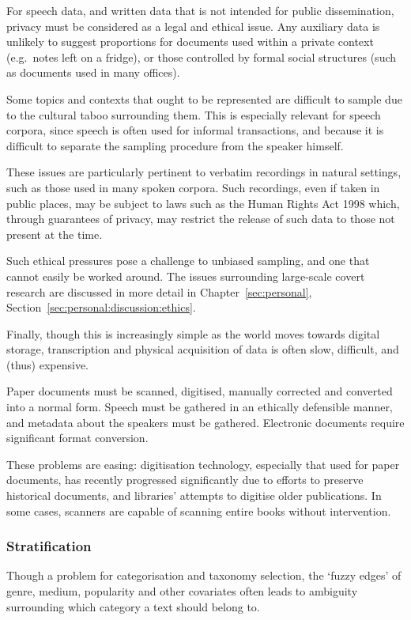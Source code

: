 For speech data, and written data that is not intended for public dissemination, privacy must be considered as a legal and ethical issue.  Any auxiliary data is unlikely to suggest proportions for documents used within a private context (e.g.\ notes left on a fridge), or those controlled by formal social structures (such as documents used in many offices).

Some topics and contexts that ought to be represented are difficult to sample due to the cultural taboo surrounding them. This is especially relevant for speech corpora, since speech is often used for informal transactions, and because it is difficult to separate the sampling procedure from the speaker himself.

These issues are particularly pertinent to verbatim recordings in natural settings, such as those used in many spoken corpora.  Such recordings, even if taken in public places, may be subject to laws such as the Human Rights Act 1998 which, through guarantees of privacy, may restrict the release of such data to those not present at the time.

Such ethical pressures pose a challenge to unbiased sampling, and one that cannot easily be worked around.  The issues surrounding large-scale covert research are discussed in more detail in Chapter~\ref{sec:personal}, Section~\ref{sec:personal:discussion:ethics}.

Finally, though this is increasingly simple as the world moves towards digital storage, transcription and physical acquisition of data is often slow, difficult, and (thus) expensive.

Paper documents must be scanned, digitised, manually corrected and converted into a normal form. Speech must be gathered in an ethically defensible manner, and metadata about the speakers must be gathered.  Electronic documents require significant format conversion.

These problems are easing: digitisation technology, especially that used for paper documents, has recently progressed significantly due to efforts to preserve historical documents, and libraries' attempts to digitise older publications. In some cases, scanners are capable of scanning entire books without intervention.








\subsubsection{Stratification}
Though a problem for categorisation and taxonomy selection, the `fuzzy edges' of genre, medium, popularity and other covariates often leads to ambiguity surrounding which category a text should belong to.

